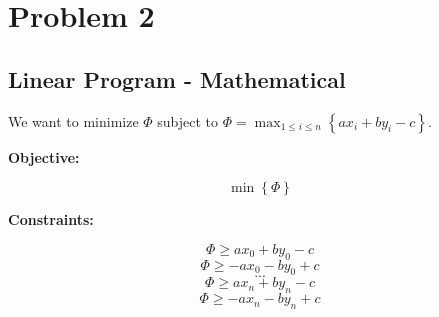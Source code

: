 \documentclass[12pt,letterpaper]{article}
\begin{document}
\newpage

\section*{Problem 2}

\subsection*{Linear Program - Mathematical}

We want to minimize $\Phi$ subject to $\Phi = \max_{1 \leq i \leq n}{\left \{ ax_i + by_i - c \right \}}$.

\textbf{Objective:}

$$
\min \left \{ \Phi \right \}
$$

\textbf{Constraints:}

$$
\Phi \geq ax_0 + by_0 - c
$$
$$
\Phi \geq - ax_0 - by_0 + c
$$
$$
...
$$
$$
\Phi \geq ax_n + by_n - c
$$
$$
\Phi \geq - ax_n - by_n + c
$$
\end{document}
